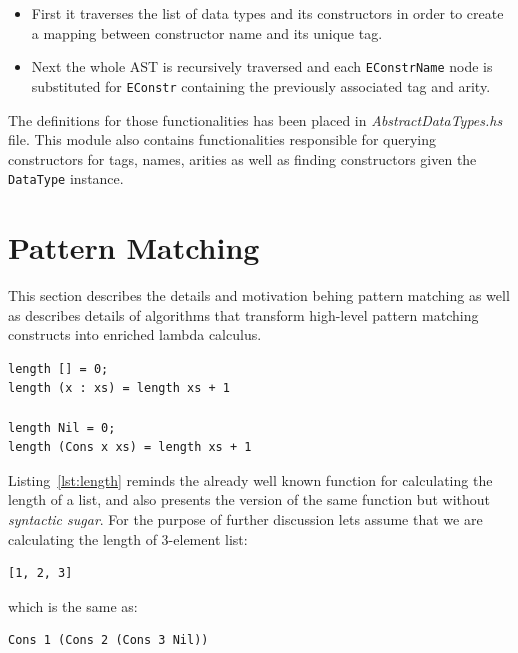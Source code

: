 \documentclass[12pt,a4paper]{report}
\begin{document}
\begin{itemize}
  \item First it traverses the list of data types and its constructors in order
    to create a mapping between constructor name and its unique tag.
  \item Next the whole AST is recursively traversed and each
    \texttt{EConstrName} node is substituted for \texttt{EConstr} containing
    the previously associated tag and arity.
\end{itemize}

The definitions for those functionalities has been placed in
\textit{AbstractDataTypes.hs} file. This module also contains functionalities
responsible for querying constructors for tags, names, arities as well as
finding constructors given the \texttt{DataType} instance.


\section{Pattern Matching}
This section describes the details and motivation behing pattern matching as
well as describes details of algorithms that transform high-level pattern
matching constructs into enriched lambda calculus.

\vspace*{0.2in}
\begin{lstlisting}[style=haskell,label=lst:length,caption={Calculating length of list.}]
length [] = 0;
length (x : xs) = length xs + 1

length Nil = 0;
length (Cons x xs) = length xs + 1
\end{lstlisting}

Listing~\ref{lst:length} reminds the already well known function for
calculating the length of a list, and also presents the version of the same
function but without \textit{syntactic sugar}. For the purpose of further
discussion lets assume that we are calculating the length of 3-element list:

\vspace*{0.2in}
\begin{lstlisting}[style=haskell]
[1, 2, 3]
\end{lstlisting}
which is the same as:

\vspace*{0.2in}
\begin{lstlisting}[style=haskell]
Cons 1 (Cons 2 (Cons 3 Nil))
\end{lstlisting}
\end{document}
